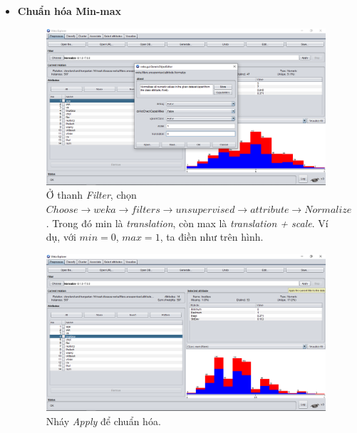 \begin{itemize}
	\item \textbf{Chuẩn hóa Min-max}
	\begin{figure}[H]
\centering
\includegraphics[width=0.98\textwidth]{5/b1.png}
\caption{Ở thanh \textit{Filter}, chọn \textit{$Choose \rightarrow weka \rightarrow filters \rightarrow unsupervised \rightarrow attribute \rightarrow Normalize$}. Trong đó min là \textit{translation}, còn max là \textit{translation + scale}. Ví dụ, với $min=0$, $max=1$, ta điền như trên hình.}
\end{figure}

\begin{figure}[H]
\centering
\includegraphics[width=0.98\textwidth]{5/b2.png}
\caption{Nháy \textit{Apply} để chuẩn hóa.}
\end{figure}


\end{itemize}
